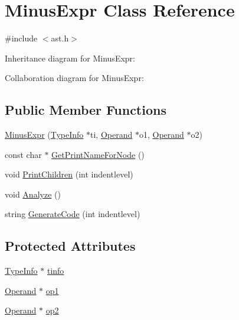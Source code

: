 \hypertarget{class_minus_expr}{}\section{Minus\+Expr Class Reference}
\label{class_minus_expr}


{\ttfamily \#include $<$ast.\+h$>$}



Inheritance diagram for Minus\+Expr\+:


Collaboration diagram for Minus\+Expr\+:
\subsection*{Public Member Functions}
\begin{DoxyCompactItemize}
\item 
\hyperlink{class_minus_expr_ab5de7cd20f4d0d8f3725750bf6d020c0}{Minus\+Expr} (\hyperlink{class_type_info}{Type\+Info} $\ast$ti, \hyperlink{class_operand}{Operand} $\ast$o1, \hyperlink{class_operand}{Operand} $\ast$o2)
\item 
const char $\ast$ \hyperlink{class_minus_expr_a1b0d17900f1686776d05a5d18233aa2e}{Get\+Print\+Name\+For\+Node} ()
\item 
void \hyperlink{class_minus_expr_ad4dccbb9a497a866f41742f9db77ae99}{Print\+Children} (int indentlevel)
\item 
void \hyperlink{class_minus_expr_af9eea4a87688777fd1ad108c24dbcd11}{Analyze} ()
\item 
string \hyperlink{class_minus_expr_a1f5c55747832a48d6dc28d1233b16a7c}{Generate\+Code} (int indentlevel)
\end{DoxyCompactItemize}
\subsection*{Protected Attributes}
\begin{DoxyCompactItemize}
\item 
\hyperlink{class_type_info}{Type\+Info} $\ast$ \hyperlink{class_minus_expr_a974e557c0b440352c557c760f689bf52}{tinfo}
\item 
\hyperlink{class_operand}{Operand} $\ast$ \hyperlink{class_minus_expr_a757e5b2e7d8a593e3a62ed2b7caadbb4}{op1}
\item 
\hyperlink{class_operand}{Operand} $\ast$ \hyperlink{class_minus_expr_ae40bb3302e5fedad288bb78ea0975205}{op2}
\end{DoxyCompactItemize}


